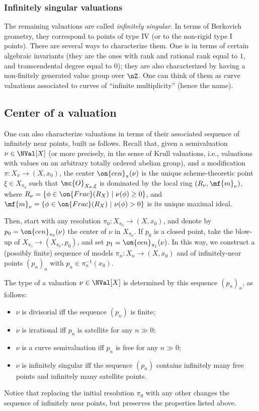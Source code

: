 \documentclass[11 pt, twoside, a4paper]{amsart}
\newcommand{\cen}{\on{cen}}
\theoremstyle{definition}
\theoremstyle{definition}
\newcommand{\Frac}{\on{Frac}}					%
\begin{document}
\subsubsection{Infinitely singular valuations}

The remaining valuations are called \emph{infinitely singular}. In terms of Berkovich geometry, they correspond to points of type IV (or to the non-rigid type I points).
There are several ways to characterize them. One is in terms of certain algebraic invariants (they are the ones with rank and rational rank equal to $1$, and transcendental degree equal to $0$); they are also characterized by having a non-finitely generated value group over $\nZ$.
One can think of them as curve valuations associated to curves of ``infinite multiplicity'' (hence the name).

\subsection{Center of a valuation}

One can also characterize valuations in terms of their associated sequence of infinitely near points, built as follows.
Recall that, given a semivaluation $\nu \in \NVal[X]$ (or more precisely, in the sense of Krull valuations, i.e., valuations with values on an arbitrary totally ordered abelian group), and a modification $\pi \colon X_\pi \to (X,x_0)$, the center $\cen_\pi(\nu)$ is the unique scheme-theoretic point $\xi \in X_{\pi_0}$ such that $\mc{O}_{X_\pi,\xi}$ is dominated by the local ring $(R_\nu,\mf{m}_\nu)$, where $R_\nu =\{\phi \in \Frac(R_X)\ |\ \nu(\phi) \geq 0\}$, and $\mf{m}_\nu=\{\phi \in \Frac(R_X)\ |\ \nu(\phi) > 0\}$ is its unique maximal ideal.

Then, start with any resolution $\pi_0 \colon X_{\pi_0} \to (X,x_0)$, and denote by $p_0=\cen_{\pi_0}(\nu)$ the center of $\nu$ in $X_{\pi_0}$.
If $p_0$ is a closed point, take the blow-up of $X_{\pi_1} \to (X_{\pi_0},p_0)$, and set $p_1 = \cen_{\pi_1}(\nu)$.
In this way, we construct a (possibly finite) sequence of models $\pi_n \colon X_n \to (X,x_0)$ and of infinitely-near points $(p_n)_n$ with $p_n \in \pi_n^{-1}(x_0)$.

The type of a valuation $\nu \in \NVal[X]$ is determined by this sequence $(p_n)_n$, as follows:
\begin{itemize}
\item $\nu$ is divisorial iff the sequence $(p_n)$ is finite;
\item $\nu$ is irrational iff $p_n$ is satellite for any $n \gg 0$;
\item $\nu$ is a curve semivaluation iff $p_n$ is free for any $n \gg 0$;
\item $\nu$ is infinitely singular iff the sequence $(p_n)$ contains infinitely many free points and infinitely many satellite points.
\end{itemize}
Notice that replacing the initial resolution $\pi_0$ with any other changes the sequence of infinitely near points, but preserves the properties listed above.
\end{document}
